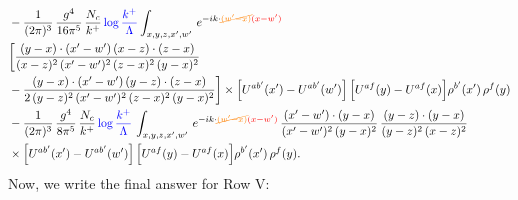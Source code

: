 \documentclass[9pt]{article}
\numberwithin{equation}{section}
\begin{document}
\begin{align}
&-\frac{1}{(2\pi)^{3}}\,\frac{g^{4}}{16\pi^{5}}\,\frac{N_{c}}{k^{+}}\,{\color{blue}\log\frac{k^{+}}{\Lambda}}\int_{x,y,z,x',w'}\,e^{-ik\cdot{\color{orange}\cancel{(w'-x)}}{\color{red}(x-w')}}\,\notag \\ & \bigg[\frac{(y-x)\cdot (x'-w')\,(x-z)\cdot (z-x)}{(x-z)^{2}\,(x'-w')^{2}\,(z-x)^{2}\,(y-x)^{2}}\notag \\ & -\frac{(y-x)\cdot (x'-w')\,(y-z)\cdot (z-x)}{2\,(y-z)^{2}\,(x'-w')^{2}\,(z-x)^{2}\,(y-x)^{2}}\bigg]\times\Big[U^{ab'}(x')-U^{ab'}(w')\Big]\,\Big[U^{af}(y)-U^{af}(x)\Big]\rho^{b'}(x')\,\rho^{f}(y)\notag\\
&-\frac{1}{(2\pi)^{3}}\,\frac{g^{4}}{8\pi^{5}}\,\frac{N_{c}}{k^{+}}\,{\color{blue}\log\frac{k^{+}}{\Lambda}}\,\int_{x,y,z,x',w'}\,e^{-ik\cdot{\color{orange}\cancel{(w'-x)}}{\color{red}(x-w')}}\,\frac{(x'-w')\cdot(y-x)}{(x'-w')^{2}\,(y-x)^{2}}\,\frac{(y-z)\cdot(y-x)}{(y-z)^{2}\,(x-z)^{2}}\notag\\
&\times\Big[U^{ab'}(x')-U^{ab'}(w')\Big]\,\Big[U^{af}(y)-U^{af}(x)\Big]\rho^{b'}(x')\,\rho^{f}(y).
\end{align}
Now, we write the final answer for Row V:
\end{document}
